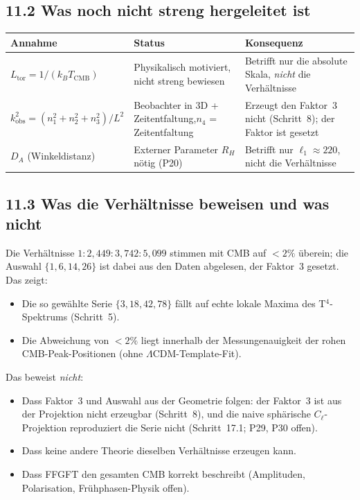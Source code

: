 \subsection*{11.2 Was noch nicht streng hergeleitet ist}

\begin{center}
\begin{tabular}{p{4cm}p{4cm}p{4cm}}
\toprule
\textbf{Annahme} & \textbf{Status} & \textbf{Konsequenz} \\
\midrule
$L_\mathrm{tor} = 1/(k_BT_\mathrm{CMB})$ &
  Physikalisch motiviert, nicht streng bewiesen &
  Betrifft nur die absolute Skala, \emph{nicht} die Verhältnisse \\
\addlinespace
$k_\mathrm{obs}^2 = (n_1^2+n_2^2+n_3^2)/L^2$ &
  Beobachter in 3D + Zeitentfaltung,\newline $n_4$ = Zeitentfaltung &
  Erzeugt den Faktor~3 nicht (Schritt~8); der Faktor ist gesetzt \\
\addlinespace
$D_A$ (Winkeldistanz) &
  Externer Parameter $R_H$ nötig (P20) &
  Betrifft nur $\ell_1 \approx 220$, nicht die Verhältnisse \\
\bottomrule
\end{tabular}
\end{center}

\subsection*{11.3 Was die Verhältnisse beweisen und was nicht}

Die Verhältnisse $1:2{,}449:3{,}742:5{,}099$ stimmen mit CMB auf
$< 2\%$ überein; die Auswahl $\{1,6,14,26\}$ ist dabei aus den Daten
abgelesen, der Faktor~3 gesetzt. Das zeigt:

\begin{itemize}
  \item Die so gewählte Serie $\{3,18,42,78\}$ fällt auf echte lokale
        Maxima des T$^4$-Spektrums (Schritt~5).
  \item Die Abweichung von $< 2\%$ liegt innerhalb der
        Messungenauigkeit der rohen CMB-Peak-Positionen
        (ohne $\Lambda$CDM-Template-Fit).
\end{itemize}

Das beweist \emph{nicht}:

\begin{itemize}
  \item Dass Faktor~3 und Auswahl aus der Geometrie folgen: der Faktor~3
        ist aus der Projektion nicht erzeugbar (Schritt~8), und die naive
        sphärische $C_\ell$-Projektion reproduziert die Serie nicht
        (Schritt~17.1; P29, P30 offen).
  \item Dass keine andere Theorie dieselben Verhältnisse erzeugen kann.
  \item Dass FFGFT den gesamten CMB korrekt beschreibt
        (Amplituden, Polarisation, Frühphasen-Physik offen).
\end{itemize}

